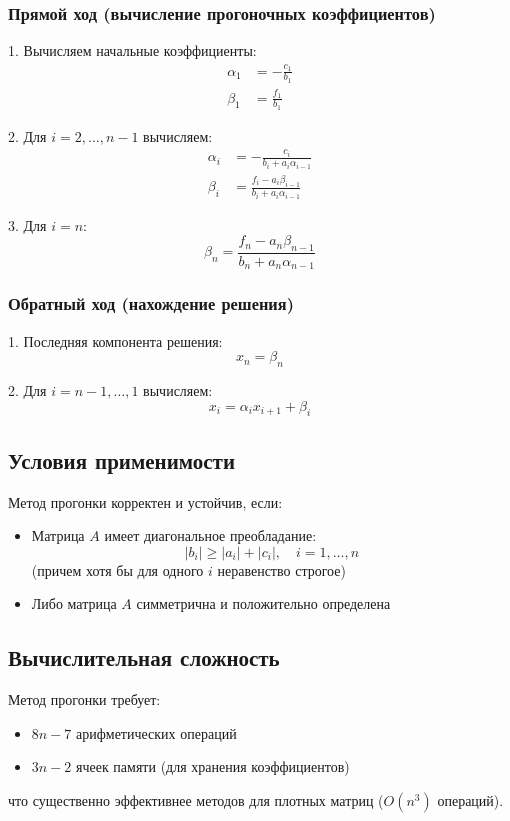 \subsubsection*{Прямой ход (вычисление прогоночных коэффициентов)}
1. Вычисляем начальные коэффициенты:
\begin{align*}
\alpha_1 &= -\frac{c_1}{b_1} \\
\beta_1 &= \frac{f_1}{b_1}
\end{align*}

2. Для $i = 2, \ldots, n-1$ вычисляем:
\begin{align*}
\alpha_i &= -\frac{c_i}{b_i + a_i\alpha_{i-1}} \\
\beta_i &= \frac{f_i - a_i\beta_{i-1}}{b_i + a_i\alpha_{i-1}}
\end{align*}

3. Для $i = n$:
\[
\beta_n = \frac{f_n - a_n\beta_{n-1}}{b_n + a_n\alpha_{n-1}}
\]

\subsubsection*{Обратный ход (нахождение решения)}
1. Последняя компонента решения:
\[
x_n = \beta_n
\]

2. Для $i = n-1, \ldots, 1$ вычисляем:
\[
x_i = \alpha_i x_{i+1} + \beta_i
\]

\subsection*{Условия применимости}
Метод прогонки корректен и устойчив, если:
\begin{itemize}
\item Матрица $A$ имеет диагональное преобладание:
\[
|b_i| \geq |a_i| + |c_i|, \quad i = 1,\ldots,n
\]
(причем хотя бы для одного $i$ неравенство строгое)
\item Либо матрица $A$ симметрична и положительно определена
\end{itemize}

\subsection*{Вычислительная сложность}
Метод прогонки требует:
\begin{itemize}
\item $8n - 7$ арифметических операций
\item $3n - 2$ ячеек памяти (для хранения коэффициентов)
\end{itemize}
что существенно эффективнее методов для плотных матриц ($O(n^3)$ операций).

